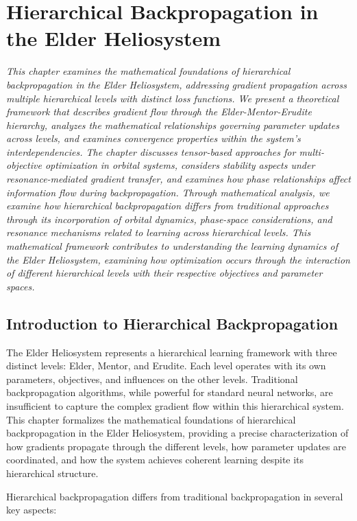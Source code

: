 \chapter{Hierarchical Backpropagation in the Elder Heliosystem}

\textit{This chapter examines the mathematical foundations of hierarchical backpropagation in the Elder Heliosystem, addressing gradient propagation across multiple hierarchical levels with distinct loss functions. We present a theoretical framework that describes gradient flow through the Elder-Mentor-Erudite hierarchy, analyzes the mathematical relationships governing parameter updates across levels, and examines convergence properties within the system's interdependencies. The chapter discusses tensor-based approaches for multi-objective optimization in orbital systems, considers stability aspects under resonance-mediated gradient transfer, and examines how phase relationships affect information flow during backpropagation. Through mathematical analysis, we examine how hierarchical backpropagation differs from traditional approaches through its incorporation of orbital dynamics, phase-space considerations, and resonance mechanisms related to learning across hierarchical levels. This mathematical framework contributes to understanding the learning dynamics of the Elder Heliosystem, examining how optimization occurs through the interaction of different hierarchical levels with their respective objectives and parameter spaces.}

\section{Introduction to Hierarchical Backpropagation}

The Elder Heliosystem represents a hierarchical learning framework with three distinct levels: Elder, Mentor, and Erudite. Each level operates with its own parameters, objectives, and influences on the other levels. Traditional backpropagation algorithms, while powerful for standard neural networks, are insufficient to capture the complex gradient flow within this hierarchical system. This chapter formalizes the mathematical foundations of hierarchical backpropagation in the Elder Heliosystem, providing a precise characterization of how gradients propagate through the different levels, how parameter updates are coordinated, and how the system achieves coherent learning despite its hierarchical structure.

Hierarchical backpropagation differs from traditional backpropagation in several key aspects:

